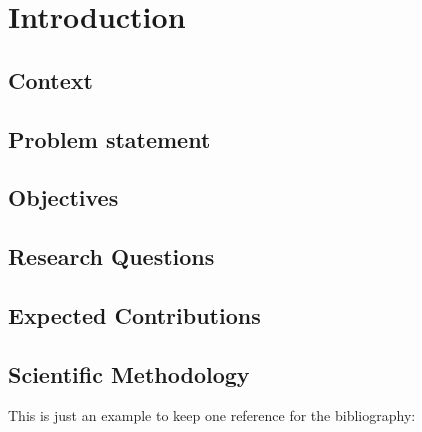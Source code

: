 \chapter{Introduction}
\label{chap:introduction}

\section{Context} 

\section{Problem statement} 

\section{Objectives}

\section{Research Questions} 

\section{Expected Contributions}

\section{Scientific Methodology}


This is just an example to keep one reference for the bibliography:\cite{Turing1936}

